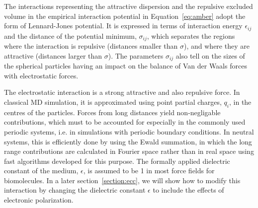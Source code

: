 The interactions representing the 
attractive dispersion and the repulsive excluded volume 
in the empirical interaction potential in Equation~\ref{eq:amber} 
adopt the form of Lennard-Jones potential. 
It is expressed in terms of interaction energy $\epsilon_{ij}$ and the distance of the potential minimum, $\sigma_{ij}$, 
which separates the regions where the interaction is repulsive (distances smaller than $\sigma$), 
and where they are attractive (distances larger than $\sigma$). 
The parameters $\sigma _{ij}$ also tell on the sizes of the spherical particles
having an impact on the balance of Van der Waals forces with electrostatic forces.



The electrostatic interaction is a strong attractive and also repulsive force. 
In classical MD simulation, it is approximated using point partial charges, $q_i$, in the centres of the particles. 
Forces from long distances yield non-negligable contributions,
which must to be accounted for especially in the commonly used 
periodic systems, i.e. in simulations with periodic boundary conditions. 
In neutral systems, this is efficiently done by using the Ewald summation,
in which the long range contributions are calculated in Fourier space rather than in real space
using fast algorithms developed for this purpose. \citep{darden93, essman95}
The formally applied dielectric constant of the medium, $\epsilon$,  
is assumed to be 1 in most force fields for biomolecules. 
In a later section~\ref{section:ecc}, we will show how to modify this interaction 
by changing the dielectric constant $\epsilon$ to include the effects of electronic polarization. 


